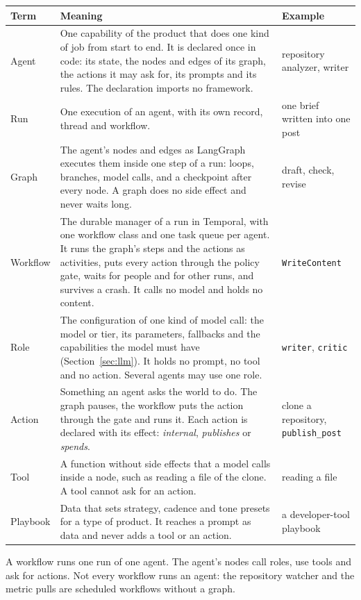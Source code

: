 \documentclass[11pt,a4paper]{article}
\begin{document}
\begin{longtable}{@{}p{2.1cm}p{9.8cm}>{\raggedright\arraybackslash}p{3.4cm}@{}}
\toprule
\textbf{Term} & \textbf{Meaning} & \textbf{Example}\\
\midrule
\endhead
Agent & One capability of the product that does one kind of job from start to end. It is declared once in code: its state, the nodes and edges of its graph, the actions it may ask for, its prompts and its rules. The declaration imports no framework. & repository analyzer, writer\\
Run & One execution of an agent, with its own record, thread and workflow. & one brief written into one post\\
Graph & The agent's nodes and edges as LangGraph executes them inside one step of a run: loops, branches, model calls, and a checkpoint after every node. A graph does no side effect and never waits long. & draft, check, revise\\
Workflow & The durable manager of a run in Temporal, with one workflow class and one task queue per agent. It runs the graph's steps and the actions as activities, puts every action through the policy gate, waits for people and for other runs, and survives a crash. It calls no model and holds no content. & \texttt{WriteContent}\\
Role & The configuration of one kind of model call: the model or tier, its parameters, fallbacks and the capabilities the model must have (Section~\ref{sec:llm}). It holds no prompt, no tool and no action. Several agents may use one role. & \texttt{writer}, \texttt{critic}\\
Action & Something an agent asks the world to do. The graph pauses, the workflow puts the action through the gate and runs it. Each action is declared with its effect: \emph{internal}, \emph{publishes} or \emph{spends}. & clone a repository, \texttt{publish\_post}\\
Tool & A function without side effects that a model calls inside a node, such as reading a file of the clone. A tool cannot ask for an action. & reading a file\\
Playbook & Data that sets strategy, cadence and tone presets for a type of product. It reaches a prompt as data and never adds a tool or an action. & a developer-tool playbook\\
\bottomrule
\end{longtable}

A workflow runs one run of one agent. The agent's nodes call roles, use tools and ask for actions. Not every workflow runs an agent: the repository watcher and the metric pulls are scheduled workflows without a graph.
\end{document}
